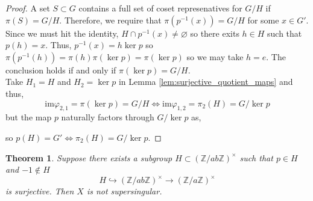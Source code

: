 \documentclass{article}
\newcommand{\Z}{\mathbb{Z}}
\newcommand{\im}[0]{\mathrm{im}}
\newtheorem{theorem}{Theorem}[section]
\theoremstyle{definition}
\theoremstyle{definition}
\theoremstyle{remark}
\begin{document}
\begin{proof}
A set $S \subset G$ contains a full set of coset represenatives for $G/H$ if $\pi(S) = G/H$. Therefore, we require that $\pi(p^{-1}(x)) = G/H$ for some $x \in G'$. Since we must hit the identity, $H \cap p^{-1}(x) \neq \varnothing$ so there exits $h \in H$ such that $p(h) = x$. Thus, $p^{-1}(x) = h \ker{p}$ so $\pi(p^{-1}(h)) = \pi(h) \pi(\ker{p}) = \pi(\ker{p})$ so we may take $h = e$. The conclusion holds if and only if $\pi(\ker{p}) = G/H$. 
\bigskip\\    
Take $H_1 = H$ and $H_2 = \ker{p}$ in Lemma \ref{lem:surjective_quotient_maps} and thus, 
\[\im{\varphi_{2,1}} = \pi(\ker{p}) = G/H \iff \im{\varphi_{1,2}} = \pi_2(H) = G/\ker{p} \]
but the map $p$ naturally factors through $G / \ker{p}$ as,
\begin{center}
\end{center}
so $p(H) = G' \iff \pi_2(H) = G / \ker{p}$. 
\end{proof}

\begin{theorem}
Suppose there exists a subgroup $H \subset (\Z / ab \Z)^\times$ such that $p \in H$ and $-1 \notin H$
\[ H \hookrightarrow (\Z / ab \Z)^\times \to (\Z / a \Z)^\times\]
is surjective. Then $X$ is not supersingular. 
\end{theorem}
\end{document}
